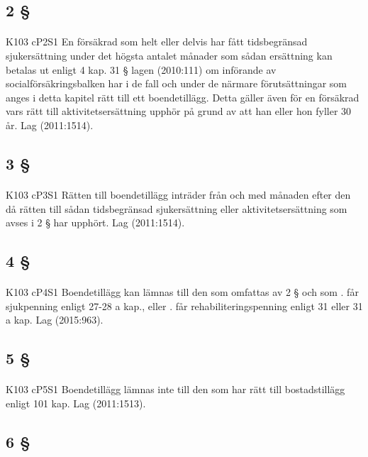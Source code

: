 \documentclass[a4paper,notitlepage,openany,10pt]{book}
\begin{document}
\subsection*{2 §}
\paragraph*{}
{\tiny K103 cP2S1}
En försäkrad som helt eller delvis har fått tidsbegränsad sjukersättning under det högsta antalet månader som sådan ersättning kan betalas ut enligt 4 kap. 31 § lagen (2010:111) om införande av socialförsäkringsbalken har i de fall och under de närmare förutsättningar som anges i detta kapitel rätt till ett boendetillägg. Detta gäller även för en försäkrad vars rätt till aktivitetsersättning upphör på grund av att han eller hon fyller 30 år.
Lag (2011:1514).
\subsection*{3 §}
\paragraph*{}
{\tiny K103 cP3S1}
Rätten till boendetillägg inträder från och med månaden efter den då rätten till sådan tidsbegränsad sjukersättning eller aktivitetsersättning som avses i 2 § har upphört.
Lag (2011:1514).
\subsection*{4 §}
\paragraph*{}
{\tiny K103 cP4S1}
Boendetillägg kan lämnas till den som omfattas av 2 § och som
. får sjukpenning enligt 27-28 a kap., eller
. får rehabiliteringspenning enligt 31 eller 31 a kap.
Lag (2015:963).
\subsection*{5 §}
\paragraph*{}
{\tiny K103 cP5S1}
Boendetillägg lämnas inte till den som har rätt till bostadstillägg enligt 101 kap.
Lag (2011:1513).
\subsection*{6 §}
\end{document}
